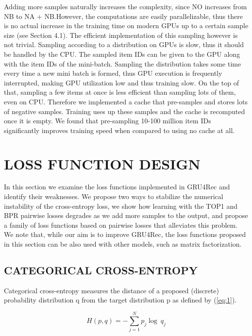 \documentclass{article} %
\begin{document}
Adding more samples naturally increases the complexity, since NO increases from NB to NA + NB.However, the computations are easily parallelizable, thus there is no actual increase in the training
time on modern GPUs up to a certain sample size (see Section 4.1). The efficient implementation of this sampling however is not trivial. Sampling according to a distribution on GPUs is slow, thus it should be handled by the CPU. The sampled item IDs can be given to the GPU along with the item IDs of the mini-batch. Sampling the distribution takes some time every time a new mini batch is formed, thus GPU execution is frequently interrupted, making GPU utilization low and thus training slow. On the top of that, sampling a few items at once is less efficient than sampling lots of them, even on CPU. Therefore we implemented a cache that pre-samples and stores lots of negative
samples. Training uses up these samples and the cache is recomputed once it is empty. We found that pre-sampling 10-100 million item IDs significantly improves training speed when compared to using no cache at all.

\section{LOSS FUNCTION DESIGN}
\label{sec:loss}
In this section we examine the loss functions implemented in GRU4Rec and identify their weaknesses. We propose two ways to stabilize the numerical instability of the cross-entropy loss, we show how learning with the TOP1 and BPR pairwise losses degrades as we add more samples to the
output, and propose a family of loss functions based on pairwise losses that alleviates this problem.
We note that, while our aim is to improve GRU4Rec, the loss functions proposed in this section can
be also used with other models, such as matrix factorization.

\subsection{ CATEGORICAL CROSS-ENTROPY}
Categorical cross-entropy measures the distance of a proposed (discrete) probability distribution q
from the target distribution p as defined by (\ref{eq:1}).

\begin{equation}\label{eq:1}
   H(p,q)=-\sum_{j=1}^{N} p_j  \log\ q_j
\end{equation}
\end{document}
